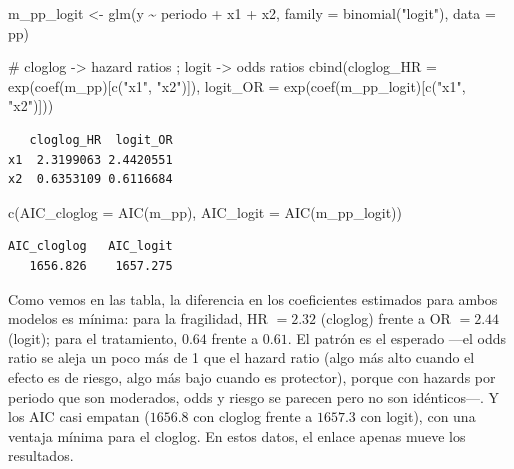 \documentclass[
  letterpaper,
  DIV=11,
  numbers=noendperiod]{scrartcl}
\newenvironment{Shaded}{\begin{snugshade}}{\end{snugshade}}
\newcommand{\AttributeTok}[1]{\textcolor[rgb]{0.40,0.45,0.13}{#1}}
\newcommand{\CommentTok}[1]{\textcolor[rgb]{0.37,0.37,0.37}{#1}}
\newcommand{\FunctionTok}[1]{\textcolor[rgb]{0.28,0.35,0.67}{#1}}
\newcommand{\NormalTok}[1]{\textcolor[rgb]{0.00,0.23,0.31}{#1}}
\newcommand{\OtherTok}[1]{\textcolor[rgb]{0.00,0.23,0.31}{#1}}
\newcommand{\SpecialCharTok}[1]{\textcolor[rgb]{0.37,0.37,0.37}{#1}}
\newcommand{\StringTok}[1]{\textcolor[rgb]{0.13,0.47,0.30}{#1}}
\begin{document}
\begin{Shaded}
\begin{Highlighting}[]
\NormalTok{m\_pp\_logit }\OtherTok{\textless{}{-}} \FunctionTok{glm}\NormalTok{(y }\SpecialCharTok{\textasciitilde{}}\NormalTok{ periodo }\SpecialCharTok{+}\NormalTok{ x1 }\SpecialCharTok{+}\NormalTok{ x2, }\AttributeTok{family =} \FunctionTok{binomial}\NormalTok{(}\StringTok{"logit"}\NormalTok{), }\AttributeTok{data =}\NormalTok{ pp)}

\CommentTok{\# cloglog {-}\textgreater{} hazard ratios ; logit {-}\textgreater{} odds ratios}
\FunctionTok{cbind}\NormalTok{(}\AttributeTok{cloglog\_HR =} \FunctionTok{exp}\NormalTok{(}\FunctionTok{coef}\NormalTok{(m\_pp)[}\FunctionTok{c}\NormalTok{(}\StringTok{"x1"}\NormalTok{, }\StringTok{"x2"}\NormalTok{)]),}
      \AttributeTok{logit\_OR   =} \FunctionTok{exp}\NormalTok{(}\FunctionTok{coef}\NormalTok{(m\_pp\_logit)[}\FunctionTok{c}\NormalTok{(}\StringTok{"x1"}\NormalTok{, }\StringTok{"x2"}\NormalTok{)]))}
\end{Highlighting}
\end{Shaded}

\begin{verbatim}
   cloglog_HR  logit_OR
x1  2.3199063 2.4420551
x2  0.6353109 0.6116684
\end{verbatim}

\begin{Shaded}
\begin{Highlighting}[]
\FunctionTok{c}\NormalTok{(}\AttributeTok{AIC\_cloglog =} \FunctionTok{AIC}\NormalTok{(m\_pp), }\AttributeTok{AIC\_logit =} \FunctionTok{AIC}\NormalTok{(m\_pp\_logit))}
\end{Highlighting}
\end{Shaded}

\begin{verbatim}
AIC_cloglog   AIC_logit 
   1656.826    1657.275 
\end{verbatim}

Como vemos en las tabla, la diferencia en los coeficientes estimados
para ambos modelos es mínima: para la fragilidad, HR \(=2.32\) (cloglog)
frente a OR \(=2.44\) (logit); para el tratamiento, \(0.64\) frente a
\(0.61\). El patrón es el esperado ---el odds ratio se aleja un poco más
de 1 que el hazard ratio (algo más alto cuando el efecto es de riesgo,
algo más bajo cuando es protector), porque con hazards por periodo que
son moderados, odds y riesgo se parecen pero no son idénticos---. Y los
AIC casi empatan (\(1656.8\) con cloglog frente a \(1657.3\) con logit),
con una ventaja mínima para el cloglog. En estos datos, el enlace apenas
mueve los resultados.
\end{document}

